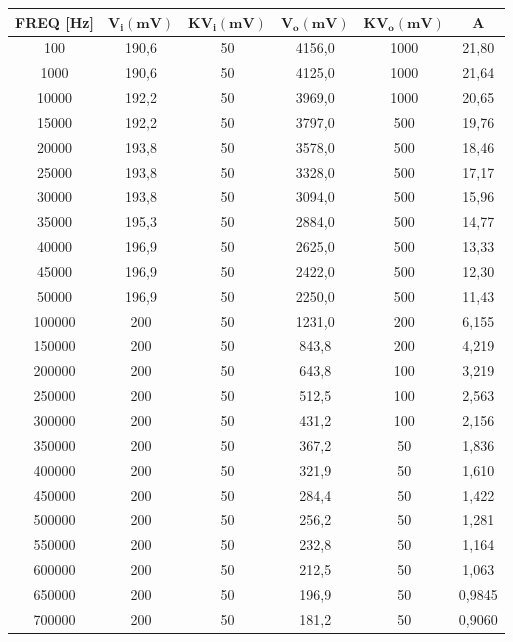 \begin{table}[!ht]
    \centering
    \begin{tabular}{|c|c|c|c|c|c|}
    \hline

        \textbf{FREQ [Hz]} & $\bm{V_i(mV)}$ & $\bm{KV_i(mV)}$ & $\bm{V_o(mV)}$ & $\bm{KV_o(mV)}$ & \textbf{A} \\ \hline

      
        100 & 190,6 & 50 & 4156,0 & 1000 & 21,80 \\ \hline
        1000 & 190,6 & 50 & 4125,0 & 1000 & 21,64 \\ \hline
        10000 & 192,2 & 50 & 3969,0 & 1000 & 20,65 \\ \hline
        15000 & 192,2 & 50 & 3797,0 & 500 & 19,76 \\ \hline
        20000 & 193,8 & 50 & 3578,0 & 500 & 18,46 \\ \hline
        25000 & 193,8 & 50 & 3328,0 & 500 & 17,17 \\ \hline
        30000 & 193,8 & 50 & 3094,0 & 500 & 15,96 \\ \hline
        35000 & 195,3 & 50 & 2884,0 & 500 & 14,77 \\ \hline
        40000 & 196,9 & 50 & 2625,0 & 500 & 13,33 \\ \hline
        45000 & 196,9 & 50 & 2422,0 & 500 & 12,30 \\ \hline
        50000 & 196,9 & 50 & 2250,0 & 500 & 11,43 \\ \hline
        100000 & 200 & 50 & 1231,0 & 200 & 6,155 \\ \hline
        150000 & 200 & 50 & 843,8 & 200 & 4,219 \\ \hline
        200000 & 200 & 50 & 643,8 & 100 & 3,219 \\ \hline
        250000 & 200 & 50 & 512,5 & 100 & 2,563 \\ \hline
        300000 & 200 & 50 & 431,2 & 100 & 2,156 \\ \hline
        350000 & 200 & 50 & 367,2 & 50 & 1,836 \\ \hline
        400000 & 200 & 50 & 321,9 & 50 & 1,610 \\ \hline
        450000 & 200 & 50 & 284,4 & 50 & 1,422 \\ \hline
        500000 & 200 & 50 & 256,2 & 50 & 1,281 \\ \hline
        550000 & 200 & 50 & 232,8 & 50 & 1,164 \\ \hline
        600000 & 200 & 50 & 212,5 & 50 & 1,063 \\ \hline
        650000 & 200 & 50 & 196,9 & 50 & 0,9845 \\ \hline
        700000 & 200 & 50 & 181,2 & 50 & 0,9060 \\ \hline															
        
    \end{tabular}
\end{table}
\FloatBarrier

